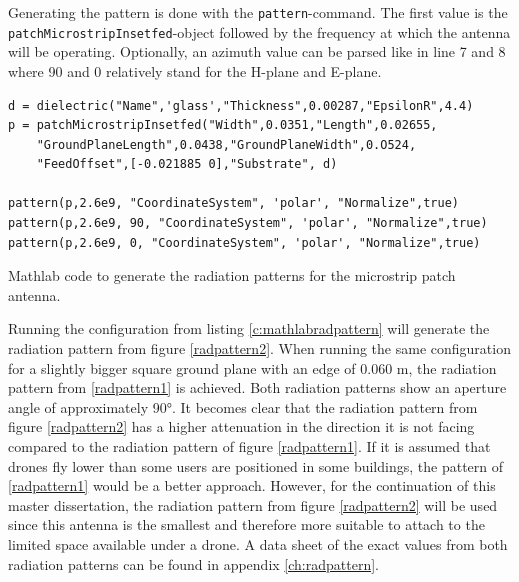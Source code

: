 Generating the pattern is done with the \verb|pattern|-command. The first value is the \\ \verb|patchMicrostripInsetfed|-object followed by the frequency
at which the antenna will be operating. Optionally, an azimuth value can be parsed like in line 7 and 8 where 90 and 0 relatively stand for the H-plane and E-plane.

\begin{listing}[h!]
\begin{verbatim}
d = dielectric("Name",'glass',"Thickness",0.00287,"EpsilonR",4.4)
p = patchMicrostripInsetfed("Width",0.0351,"Length",0.02655,
    "GroundPlaneLength",0.0438,"GroundPlaneWidth",0.O524,
    "FeedOffset",[-0.021885 0],"Substrate", d)

pattern(p,2.6e9, "CoordinateSystem", 'polar', "Normalize",true)
pattern(p,2.6e9, 90, "CoordinateSystem", 'polar', "Normalize",true)
pattern(p,2.6e9, 0, "CoordinateSystem", 'polar', "Normalize",true)
\end{verbatim}
\caption{Mathlab code to generate the radiation patterns for the microstrip patch antenna.}
\label{c:mathlabradpattern}
\end{listing}

Running the configuration from listing \ref{c:mathlabradpattern} will generate the radiation pattern from figure \ref{radpattern2}.
When running the same configuration for a slightly bigger square ground plane with an edge of 0.060 m, the radiation pattern from \ref{radpattern1} is
achieved. Both radiation patterns show an aperture angle of approximately 90°. It becomes clear that the radiation pattern from figure \ref{radpattern2} has a higher attenuation in the direction it is not facing compared to
the radiation pattern of figure \ref{radpattern1}. If it is assumed that drones fly lower than some users are positioned in some buildings, the pattern of 
\ref{radpattern1} would be a better approach. However, for the continuation of this master dissertation, the radiation pattern from figure \ref{radpattern2} 
will be used since this antenna is the smallest
and therefore more suitable to attach to the limited space available under a drone.  A data sheet of the exact values from both radiation patterns can be
found in appendix \ref{ch:radpattern}.

